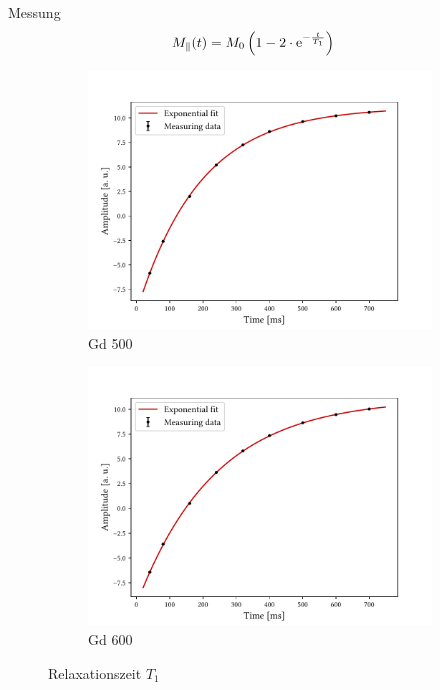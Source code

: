 \begin{frame}{Messung}
	\begin{align*}
	M_\parallel (t)&=M_0\left(1-2\cdot\mathrm{e}^{-\frac{t}{T_1}}\right)
	\end{align*}
	\begin{figure}
	\centering
		\begin{subfigure}{.49\textwidth}
		\centering
		\includegraphics[scale=.36]{..//figures//f61_abb_1.pdf}
		\caption{Gd 500}
		\end{subfigure}
		\begin{subfigure}{.49\textwidth}
		\centering
		\includegraphics[scale=.36]{..//figures//f61_abb_1_600.pdf}
		\caption{Gd 600}
		\end{subfigure}
	\caption{Relaxationszeit $T_1$}
	\end{figure}
\end{frame}

